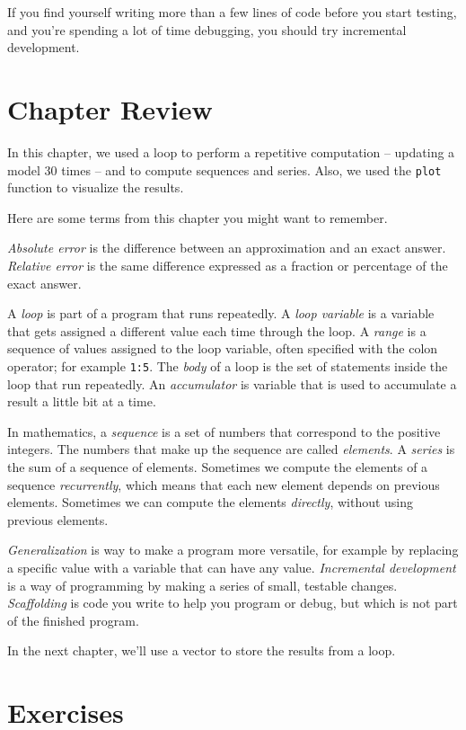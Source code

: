 If you find yourself writing more than a few lines of code before
you start testing, and you're spending a lot of time debugging,
you should try incremental development.




\section{Chapter Review}

In this chapter, we used a loop to perform a repetitive computation -- updating a model 30 times -- and to compute sequences and series.  Also, we used the {\tt plot} function to visualize the results.

Here are some terms from this chapter you might want to remember.

{\em Absolute error} is the difference between an approximation and
an exact answer. {\em Relative error} is the same difference expressed as a fraction or percentage of the exact answer.

A {\em loop} is part of a program that runs repeatedly.
A {\em loop variable} is a variable that gets assigned a different value each time through the loop.
A {\em range} is a sequence of values assigned to the loop variable, often
specified with the colon operator; for example {\tt 1:5}.
The {\em body} of a loop is the set of statements inside the loop that run repeatedly.
An {\em accumulator} is variable that is used to accumulate a result a little bit at a time.

In mathematics, a {\em sequence} is a set of numbers that correspond
to the positive integers.
The numbers that make up the sequence are called {\em elements}.  
A {\em series} is the sum of a sequence of elements.
Sometimes we compute the elements of a sequence {\em recurrently}, which means that each new element depends on previous elements.  Sometimes we can compute the elements {\em directly}, without using previous elements.

{\em Generalization} is way to make a program more versatile, for example by replacing a specific value with a variable that can have any value.
{\em Incremental development} is a way of programming by making a series of small, testable changes.
{\em Scaffolding} is code you write to help you program or debug, but
which is not part of the finished program.

In the next chapter, we'll use a vector to store the results from a loop.


\section{Exercises}

